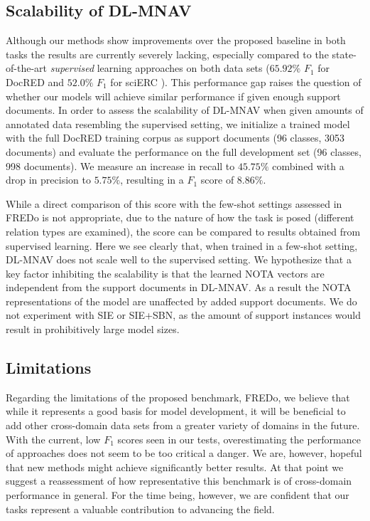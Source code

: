 \documentclass[11pt]{article}
\begin{document}
\subsection{Scalability of DL-MNAV}
Although our methods show improvements over the proposed baseline in both tasks the results are currently severely lacking, especially compared to the state-of-the-art \textit{supervised} learning approaches on both data sets ($65.92\%$ $F_1$ for DocRED \cite{xu_entity_2021} and $52.0\%$ $F_1$ for sciERC \cite{ye_pack_2021}). This performance gap raises the question of whether our models will achieve similar performance if given enough support documents.
In order to assess the scalability of DL-MNAV when given amounts of annotated data resembling the supervised setting, we initialize a trained model with the full DocRED training corpus as support documents (96 classes, 3053 documents) and evaluate the performance on the full development set (96 classes, 998 documents). We measure an increase in recall to $45.75\%$ combined with a drop in precision to $5.75\%$, resulting in a $F_1$ score of $8.86\%$. 

While a direct comparison of this score with the few-shot settings assessed in FREDo is not appropriate, due to the nature of how the task is posed (different relation types are examined), the score can be compared to results obtained from supervised learning. 
Here we see clearly that, when trained in a few-shot setting, DL-MNAV does not scale well to the supervised setting.
We hypothesize that a key factor inhibiting the scalability is that the learned NOTA vectors are independent from the support documents in DL-MNAV.
As a result the NOTA representations of the model are unaffected by added support documents.
We do not experiment with SIE or SIE+SBN, as the amount of support instances would result in prohibitively large model sizes.\\

\subsection{Limitations}
Regarding the limitations of the proposed benchmark, FREDo, we believe that while it represents a good basis for model development, it will be beneficial to add other cross-domain data sets from a greater variety of domains in the future.
With the current, low $F_1$ scores seen in our tests, overestimating the performance of approaches does not seem to be too critical a danger. We are, however, hopeful that new methods might achieve significantly better results.
At that point we suggest a reassessment of how representative this benchmark is of cross-domain performance in general.
For the time being, however, we are confident that our tasks represent a valuable contribution to advancing the field.
\end{document}
